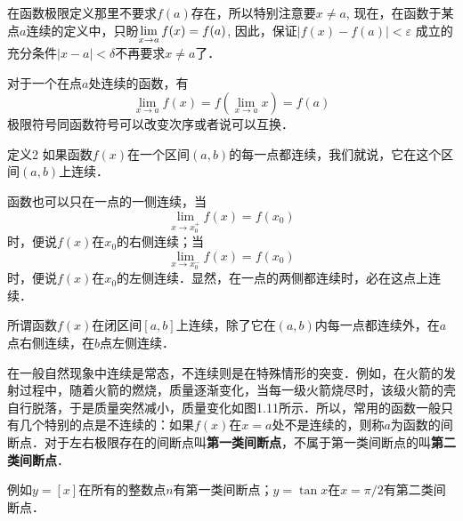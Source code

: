 \begin{rmk}
在函数极限定义那里不要求$f(a)$存在，所以特别注意要$x\ne a$, 现在，在函数于某点$a$连续的定义中，只盼$\displaystyle\lim_{x\to a} f(x)=f(a)$, 因此，保证$|f(x)-f(a)|<\varepsilon$
成立的充分条件$|x-a|<\delta$不再要求$x\ne a$了．
\end{rmk}

对于一个在点$a$处连续的函数，有
\[\lim_{x\to a}f (x) =f \left(\lim_{x\to a} x\right) =f (a)\]  
极限符号同函数符号可以改变次序或者说可以互换．

\begin{blk}
 {定义2 }如果函数$f(x)$在一个区间$(a,b)$的每一点都连续，我们就说，它在这个区间$(a,b)$上连续．   
\end{blk}

函数也可以只在一点的一侧连续，当
\[\lim_{x\to x_0^+} f (x) =f (x_0)\]
时，便说$f(x)$在$x_0$的右侧连续；当
\[\lim_{x\to x_0^-} f (x) =f (x_0)\]
时，便说$f(x)$在$x_0$的左侧连续．显然，在一点的两侧都连续时，必在这点上连续．

所谓函数$f(x)$在闭区间$[a,b]$上连续，除了它在$(a,b)$内每一点都连续外，在$a$点右侧连续，在$b$点左侧连续．

在一般自然现象中连续是常态，不连续则是在特殊情形的突变．例如，在火箭的发射过程中，随着火箭的燃烧，质量逐渐变化，当每一级火箭烧尽时，该级火箭的壳自行脱落，于是质量突然减小，质量变化如图1.11所示．所以，常用的函数一般只有几个特别的点是不连续的：如果$f(x)$在$x=a$处不是连续的，则称$a$为函数的间断点．对于左右极限存在的间断点叫\textbf{第一类间断点}，不属于第一类间断点的叫\textbf{第二类间断点}．

例如$y=[x]$在所有的整数点$n$有第一类间断点；$y=\tan x$在$x=\pi/2$有第二类间断点．

\begin{figure}[htp]
    \centering
    \begin{minipage}[t]{0.48\textwidth}
    \centering
    \caption{}
    \end{minipage}
    \begin{minipage}[t]{0.48\textwidth}
    \centering
    \caption{}
    \end{minipage}
    \end{figure}

